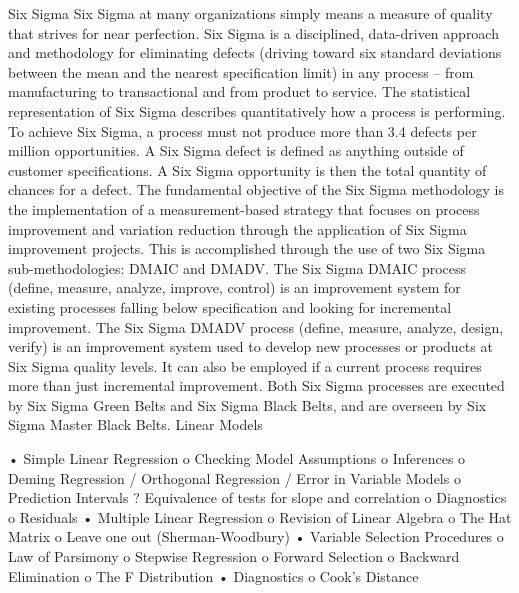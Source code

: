 Six Sigma 
Six Sigma at many organizations simply means a measure of quality that strives for near perfection. Six Sigma is a disciplined,  data-driven approach and methodology for eliminating defects (driving 
toward six standard deviations between the mean and the nearest specification limit) in any process – from manufacturing to transactional and from product to service. The statistical representation of Six Sigma describes quantitatively how a process is performing. To achieve Six Sigma, a process must not produce more than 3.4 defects per million opportunities. A Six Sigma defect is defined as anything outside of customer specifications. A Six Sigma opportunity is then the total quantity of chances for a defect. The fundamental objective of the Six Sigma methodology is the implementation of a measurement-based strategy that focuses on process improvement and variation reduction through the application of Six Sigma improvement projects. 
This is accomplished through the use of two Six Sigma sub-methodologies: DMAIC and DMADV.  The Six Sigma DMAIC process (define, measure, analyze, improve, control) is an improvement system for existing processes falling below specification and looking for incremental improvement. 
The Six Sigma DMADV process (define, measure, analyze, design, verify) is an improvement system used to develop new processes or products at Six Sigma quality levels. It can also be employed if a current process requires more than just incremental improvement.
Both Six Sigma processes are executed by Six Sigma Green Belts and Six Sigma Black Belts, and are overseen by Six Sigma Master Black Belts.
Linear Models

•	Simple Linear Regression 
o	Checking Model Assumptions
o	Inferences
o	Deming Regression / Orthogonal Regression / Error in Variable Models
o	Prediction Intervals
?	Equivalence of tests for slope and correlation 
o	Diagnostics
o	Residuals
•	Multiple Linear Regression
o	Revision of Linear Algebra
o	The Hat Matrix
o	Leave one out (Sherman-Woodbury)
•	Variable Selection Procedures
o	Law of Parsimony
o	Stepwise Regression
o	Forward Selection
o	Backward Elimination
o	The F Distribution
•	Diagnostics
o	Cook’s Distance

